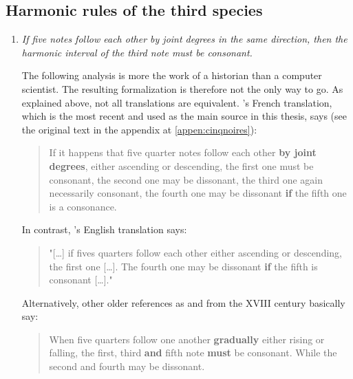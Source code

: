 \subsection{Harmonic rules of the third species}
\begin{enumerate}[wide, label=\bfseries 3.H\arabic*]
    \item\label{rule:fivequarters} \textit{If five notes follow each other by joint degrees in the same direction, then the harmonic interval of the third note must be consonant.} \textcite[p.73]{GaPFr}

    The following analysis is more the work of a historian than a computer scientist. The resulting formalization is therefore not the only way to go. As explained above, not all translations are equivalent. \citeauthor{GaPFr}'s French translation, which is the most recent and used as the main source in this thesis, says (see the original text in the appendix at \ref{appen:cinqnoires}):
    \begin{quote}
        If it happens that five quarter notes follow each other \textbf{by joint degrees}, either ascending or descending, the first one must be consonant, the second one may be dissonant, the third one again necessarily consonant, the fourth one may be dissonant \textbf{if} the fifth one is a consonance.
    \end{quote}

    In contrast, \citeauthor{GaPEng}'s English translation says:
    \begin{quotation}
        "[\dots] if fives quarters follow each other either ascending or descending, the first one [\dots].
        The fourth one may be dissonant \textbf{if} the fifth is consonant [\dots]."
        \textcite[p.50]{GaPEng}
    \end{quotation}

    Alternatively, other older references as \parencite[p.51]{IMSLPfr} and \parencite[p.4]{IMSLPeng} from the XVIII century basically say:
    \begin{quote}
        When five quarters follow one another \textbf{gradually} either rising or falling, the first, third \textbf{and} fifth note \textbf{must} be consonant. While the second and fourth may be dissonant.
    \end{quote}


\end{enumerate}
